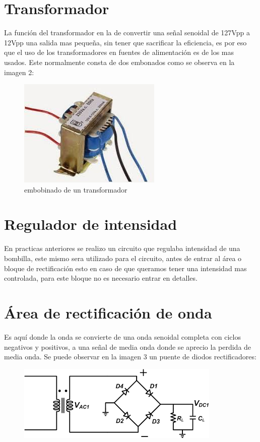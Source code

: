 \documentclass[11pt,a4paper]{article}
\begin{document}
\section{Transformador}

La función del transformador en la de convertir una señal senoidal de 127Vpp a 12Vpp una salida mas pequeña, sin tener que sacrificar la eficiencia, es por eso que el uso de los transformadores en fuentes de alimentación es de los mas usados. Este normalmente consta de dos embonados como se observa en la imagen 2:

\begin{figure}[h]
\begin{center}
\includegraphics[scale=0.5]{3.jpeg}
\caption{embobinado de un transformador}
\end{center}
\end{figure}


\section{Regulador de intensidad}

En practicas anteriores se realizo un circuito que regulaba intensidad de una bombilla, este mismo sera utilizado para el circuito, antes de entrar al área o bloque de rectificación esto en caso de que queramos tener una intensidad mas controlada, para este bloque no es necesario entrar en detalles.

\section{Área de rectificación de onda}

Es aquí donde la onda se convierte de una onda senoidal completa con ciclos negativos y positivos, a una señal de media onda donde se aprecio la perdida de media onda. Se puede observar en la imagen 3 un puente de diodos rectificadores:

\begin{figure}[h]
\begin{center}
\includegraphics[scale=0.5]{4.jpeg}
\end{center}
\end{figure}
\end{document}
